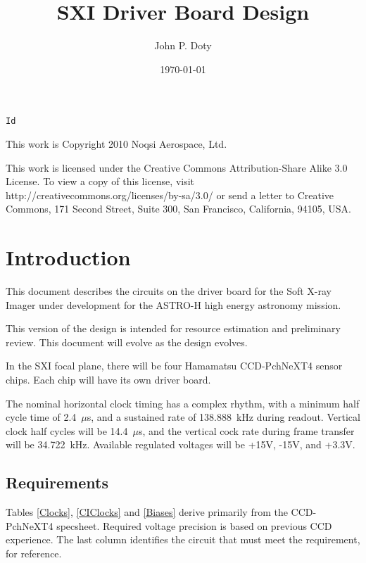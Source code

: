 \documentclass[a4paper,12pt]{article}
\author{John P. Doty}
\date{\today}
\title{SXI Driver Board Design}
\begin{document}
\begin{titlepage}
\maketitle
\begin{center}
\verb$Id$
\end{center}
\vspace{5cm}

This work is Copyright 2010 Noqsi Aerospace, Ltd.

This work is licensed under the Creative Commons Attribution-Share Alike 3.0 License. To view a copy of this license, visit http://creativecommons.org/licenses/by-sa/3.0/ or send a letter to Creative Commons, 171 Second Street, Suite 300, San Francisco, California, 94105, USA.

\end{titlepage} 

\section{Introduction}
This document describes the circuits on the driver board for the Soft X-ray Imager under development for the ASTRO-H high energy astronomy mission.

This version of the design is intended for resource estimation and preliminary review. This document will evolve as the design evolves.

In the SXI focal plane, there will be four Hamamatsu CCD-PchNeXT4 sensor chips. Each chip will have its own driver board. 

The nominal horizontal clock timing has a complex rhythm, with a minimum half cycle time of 2.4\ $\mu$s, and a sustained rate of 138.888\ kHz during readout. Vertical clock half cycles will be 14.4\ $\mu$s, and the vertical cock rate during frame transfer will be 34.722\ kHz. Available regulated voltages will be +15V, -15V, and +3.3V. 


\subsection{Requirements}
Tables \ref{Clocks}, \ref{CIClocks} and \ref{Biases} derive primarily from the CCD-PchNeXT4 specsheet. Required voltage precision is based on previous CCD experience. The last column identifies the circuit that must meet the requirement, for reference.
\end{document}
